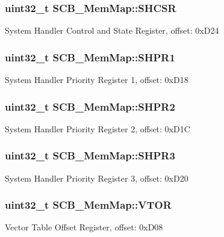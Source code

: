 \subsubsection[{S\+H\+C\+S\+R}]{\setlength{\rightskip}{0pt plus 5cm}uint32\+\_\+t S\+C\+B\+\_\+\+Mem\+Map\+::\+S\+H\+C\+S\+R}\label{struct_s_c_b___mem_map_ae2b73d4b9744b878527466ec57dbfdb7}
System Handler Control and State Register, offset\+: 0x\+D24 \hypertarget{struct_s_c_b___mem_map_afe02d5ca0102ec35b79172d453854ed0}{}
\subsubsection[{S\+H\+P\+R1}]{\setlength{\rightskip}{0pt plus 5cm}uint32\+\_\+t S\+C\+B\+\_\+\+Mem\+Map\+::\+S\+H\+P\+R1}\label{struct_s_c_b___mem_map_afe02d5ca0102ec35b79172d453854ed0}
System Handler Priority Register 1, offset\+: 0x\+D18 \hypertarget{struct_s_c_b___mem_map_a1636322022eb10e4acedf40018708b68}{}
\subsubsection[{S\+H\+P\+R2}]{\setlength{\rightskip}{0pt plus 5cm}uint32\+\_\+t S\+C\+B\+\_\+\+Mem\+Map\+::\+S\+H\+P\+R2}\label{struct_s_c_b___mem_map_a1636322022eb10e4acedf40018708b68}
System Handler Priority Register 2, offset\+: 0x\+D1\+C \hypertarget{struct_s_c_b___mem_map_a8ac3a3b8dd23fb279640b98a95fb796a}{}
\subsubsection[{S\+H\+P\+R3}]{\setlength{\rightskip}{0pt plus 5cm}uint32\+\_\+t S\+C\+B\+\_\+\+Mem\+Map\+::\+S\+H\+P\+R3}\label{struct_s_c_b___mem_map_a8ac3a3b8dd23fb279640b98a95fb796a}
System Handler Priority Register 3, offset\+: 0x\+D20 \hypertarget{struct_s_c_b___mem_map_aa327db1d9948595498fba43acc8d336b}{}
\subsubsection[{V\+T\+O\+R}]{\setlength{\rightskip}{0pt plus 5cm}uint32\+\_\+t S\+C\+B\+\_\+\+Mem\+Map\+::\+V\+T\+O\+R}\label{struct_s_c_b___mem_map_aa327db1d9948595498fba43acc8d336b}
Vector Table Offset Register, offset\+: 0x\+D08 

